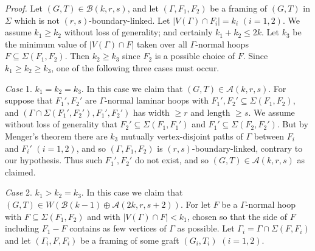 \textit{Proof.} Let $(G, T) \in \mathscr{B}(k, r, s)$, and let $(\Gamma, F_1, F_2)$ be a framing of $(G, T)$ in $\Sigma$ which is not $(r, s)$-boundary-linked. Let $|V(\Gamma) \cap F_i| = k_i$ $(i = 1, 2)$. We assume $k_1 \ge k_2$ without loss of generality; and certainly $k_1 + k_2 \le 2k$. Let $k_3$ be the minimum value of $|V(\Gamma) \cap F|$ taken over all $\Gamma$-normal hoops $F \subseteq \Sigma(F_1, F_2)$. Then $k_2 \ge k_3$ since $F_2$ is a possible choice of $F$. Since $k_1 \ge k_2 \ge k_3$, one of the following three cases must occur.

\textit{Case} 1. $k_1 = k_2 = k_3$. In this case we claim that $(G, T) \in \mathscr{A}(k, r, s)$. For suppose that $F_1', F_2'$ are $\Gamma$-normal laminar hoops with $F_1', F_2' \subseteq \Sigma(F_1, F_2)$, and $(\Gamma \cap \Sigma(F_1', F_2'), F_1', F_2')$ has width $\ge r$ and length $\ge s$. We assume without loss of generality that $F_2' \subseteq \Sigma(F_1, F_1')$ and $F_1' \subseteq \Sigma(F_2, F_2')$. But by Menger's theorem there are $k_3$ mutually vertex-disjoint paths of $\Gamma$ between $F_i$ and $F_i'$ $(i = 1, 2)$, and so $(\Gamma, F_1, F_2)$ is $(r, s)$-boundary-linked, contrary to our hypothesis. Thus such $F_1', F_2'$ do not exist, and so $(G, T) \in \mathscr{A}(k, r, s)$ as claimed.

\textit{Case} 2. $k_1 > k_2 = k_3$. In this case we claim that $(G, T) \in W(\mathscr{B}(k - 1) \oplus \mathscr{A}(2k, r, s + 2))$. For let $F$ be a $\Gamma$-normal hoop with $F \subseteq \Sigma(F_1, F_2)$ and with $|V(\Gamma) \cap F| < k_1$, chosen so that the side of $F$ including $F_1 - F$ contains as few vertices of $\Gamma$ as possible. Let $\Gamma_i = \Gamma \cap \Sigma(F, F_i)$ and let $(\Gamma_i, F, F_i)$ be a framing of some graft $(G_i, T_i)$ $(i = 1, 2)$.

